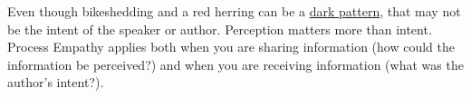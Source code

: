 Even though bikeshedding and a red herring can be a \href{https://en.wikipedia.org/wiki/Dark_pattern}{dark pattern},%
that may not be the intent of the speaker or author. Perception matters more than intent.
%
%
Process Empathy applies both when you are sharing information (how could the information be perceived?) and when you are receiving information (what was the author's intent?).